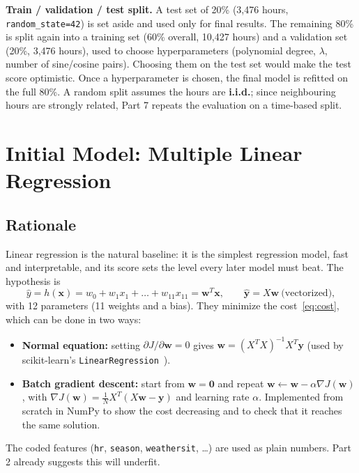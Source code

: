 \documentclass[11pt]{article}
\newcommand{\code}[1]{\texttt{#1}}
\newcommand{\w}{\mathbf{w}}
\newcommand{\x}{\mathbf{x}}
\newcommand{\y}{\mathbf{y}}
\begin{document}
\textbf{Train / validation / test split.} A test set of 20\% (3,476 hours, \code{random\_state=42})
is set aside and used only for final results. The remaining 80\% is split again into a training set
(60\% overall, 10,427 hours) and a validation set (20\%, 3,476 hours), used to choose hyperparameters
(polynomial degree, $\lambda$, number of sine/cosine pairs). Choosing them on the test set would make
the test score optimistic. Once a hyperparameter is chosen, the final model is refitted on the full
80\%. A random split assumes the hours are \textbf{i.i.d.}; since neighbouring hours are strongly
related, Part 7 repeats the evaluation on a time-based split.

\section{Initial Model: Multiple Linear Regression}

\subsection{Rationale}

Linear regression is the natural baseline: it is the simplest regression model, fast and
interpretable, and its score sets the level every later model must beat. The hypothesis is
\begin{equation}
  \hat{y} = h(\x) = w_0 + w_1x_1 + \dots + w_{11}x_{11} = \w^T\x ,
  \qquad \hat{\y} = X\w \ \text{(vectorized)},
\end{equation}
with 12 parameters (11 weights and a bias). They minimize the cost~\eqref{eq:cost}, which can be done in two ways:
\begin{itemize}
  \item \textbf{Normal equation:} setting $\partial J/\partial\w = 0$ gives $\w = (X^TX)^{-1}X^T\y$
        (used by scikit-learn's \code{LinearRegression}~\cite{sklearn}).
  \item \textbf{Batch gradient descent:} start from $\w = \mathbf{0}$ and repeat
        $\w \leftarrow \w - \alpha \nabla J(\w)$, with $\nabla J(\w) = \frac{1}{N}X^T(X\w - \y)$ and learning rate $\alpha$.
        Implemented from scratch in NumPy to show the cost decreasing and to check that it reaches the same solution.
\end{itemize}
The coded features (\code{hr}, \code{season}, \code{weathersit}, \ldots) are used as plain numbers.
Part 2 already suggests this will underfit.
\end{document}
